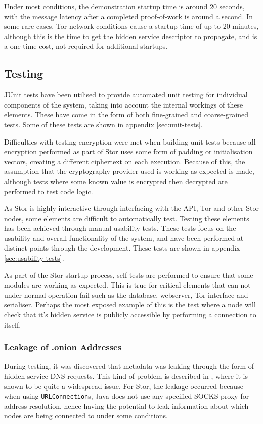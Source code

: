 		Under most conditions, the demonstration startup time is around 20 seconds, with the message latency after a completed proof-of-work is around a second. In some rare cases, Tor network conditions cause a startup time of up to 20 minutes, although this is the time to get the hidden service descriptor to propagate, and is a one-time cost, not required for additional startups.
	\subsection{Testing}
		JUnit tests have been utilised to provide automated unit testing for individual components of the system, taking into account the internal workings of these elements. These have come in the form of both fine-grained and coarse-grained tests. Some of these tests are shown in appendix \ref{sec:unit-tests}.
	
		Difficulties with testing encryption were met when building unit tests because all encryption performed as part of Stor uses some form of padding or initialisation vectors, creating a different ciphertext on each execution. Because of this, the assumption that the cryptography provider used is working as expected is made, although tests where some known value is encrypted then decrypted are performed to test code logic.
		
		As Stor is highly interactive through interfacing with the API, Tor and other Stor nodes, some elements are difficult to automatically test. Testing these elements has been achieved through manual usability tests. These tests focus on the usability and overall functionality of the system, and have been performed at distinct points through the development. These tests are shown in appendix \ref{sec:usability-tests}.
		
		As part of the Stor startup process, self-tests are performed to ensure that some modules are working as expected. This is true for critical elements that can not under normal operation fail such as the database, webserver, Tor interface and serialiser. Perhaps the most exposed example of this is the test where a node will check that it's hidden service is publicly accessible by performing a connection to itself.
		
		\subsubsection*{Leakage of .onion Addresses}
			During testing, it was discovered that metadata was leaking through the form of hidden service DNS requests. This kind of problem is described in \cite{Thomas:2014:MLO:2665943.2665951}, where it is shown to be quite a widespread issue. For Stor, the leakage occurred because when using \texttt{URLConnection}s, Java does not use any specified SOCKS proxy for address resolution, hence having the potential to leak information about which nodes are being connected to under some conditions.
			
